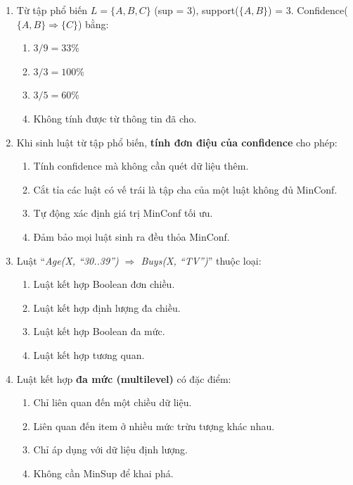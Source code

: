 \documentclass[10pt]{article}
\begin{document}
\begin{enumerate}[leftmargin=*, label=\textbf{Câu \arabic*.}]
    \item Từ tập phổ biến $L = \{A, B, C\}$ (sup = 3), support($\{A,B\}$) = 3. Confidence($\{A,B\} \Rightarrow \{C\}$) bằng:
    \begin{enumerate}[label=\Alph*.]
        \item $3/9 = 33\%$
        \item $3/3 = 100\%$
        \item $3/5 = 60\%$
        \item Không tính được từ thông tin đã cho.
    \end{enumerate}

    \item Khi sinh luật từ tập phổ biến, \textbf{tính đơn điệu của confidence} cho phép:
    \begin{enumerate}[label=\Alph*.]
        \item Tính confidence mà không cần quét dữ liệu thêm.
        \item Cắt tỉa các luật có vế trái là tập cha của một luật không đủ MinConf.
        \item Tự động xác định giá trị MinConf tối ưu.
        \item Đảm bảo mọi luật sinh ra đều thỏa MinConf.
    \end{enumerate}

    \item Luật ``\textit{Age(X, ``30..39'') $\Rightarrow$ Buys(X, ``TV'')}'' thuộc loại:
    \begin{enumerate}[label=\Alph*.]
        \item Luật kết hợp Boolean đơn chiều.
        \item Luật kết hợp định lượng đa chiều.
        \item Luật kết hợp Boolean đa mức.
        \item Luật kết hợp tương quan.
    \end{enumerate}

    \item Luật kết hợp \textbf{đa mức (multilevel)} có đặc điểm:
    \begin{enumerate}[label=\Alph*.]
        \item Chỉ liên quan đến một chiều dữ liệu.
        \item Liên quan đến item ở nhiều mức trừu tượng khác nhau.
        \item Chỉ áp dụng với dữ liệu định lượng.
        \item Không cần MinSup để khai phá.
    \end{enumerate}


\end{enumerate}
\end{document}
